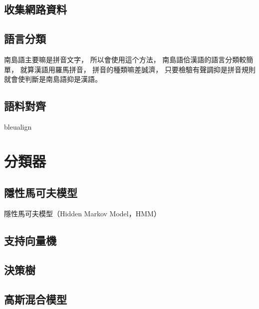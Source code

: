 \subsection{收集網路資料}
\label{小節：收集網路資料}

\subsection{語言分類}
\label{小節：語言分類}
南島語主要嘛是拼音文字，
所以會使用這个方法，
南島語佮漢語的語言分類較簡單，
就算漢語用羅馬拼音，
拼音的種類嘛差誠濟，
只要檢驗有聲調抑是拼音規則就會使判斷是南島語抑是漢語。


\subsection{語料對齊}
\label{小節：語料對齊}
bleualign


\section{分類器}
\label{節：分類器}

\subsection{隱性馬可夫模型}
\label{小節：隱性馬可夫模型}
隱性馬可夫模型（Hidden Markov Model，HMM）

\subsection{支持向量機}
\label{小節：支持向量機}

\subsection{決策樹}
\label{小節：決策樹}

\subsection{高斯混合模型}
\label{小節：高斯混合模型}


